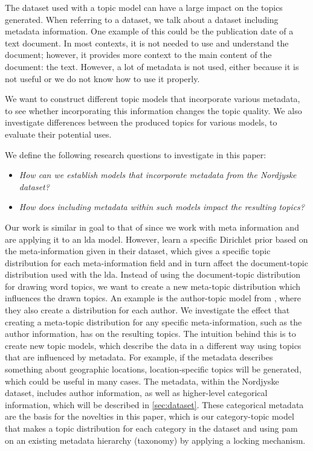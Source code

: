 The dataset used with a topic model can have a large impact on the topics generated.
When referring to a dataset, we talk about a dataset including metadata information.
One example of this could be the publication date of a text document. 
In most contexts, it is not needed to use and understand the document; however, it provides more context to the main content of the document: the text.
However, a lot of metadata is not used, either because it is not useful or we do not know how to use it properly. 

We want to construct different topic models that incorporate various metadata, to see whether incorporating this information changes the topic quality. 
We also investigate differences between the produced topics for various models, to evaluate their potential uses.

We define the following research questions to investigate in this paper:

\begin{itemize}
	\item \textit{How can we establish models that incorporate metadata from the Nordjyske dataset?}
	\item \textit{How does including metadata within such models impact the resulting topics?}
\end{itemize}

Our work is similar in goal to that of \citet{MetaLDA2017} since we work with meta information and are applying it to an \gls{lda} model.
However, \citet{MetaLDA2017} learn a specific Dirichlet prior based on the meta-information given in their dataset, which gives a specific topic distribution for each meta-information field and in turn affect the document-topic distribution used with the \gls{lda}.
Instead of using the document-topic distribution for drawing word topics, we want to create a new meta-topic distribution which influences the drawn topics.
An example is the author-topic model from \citet{author_topic_2012}, where they also create a distribution for each author.
We investigate the effect that creating a meta-topic distribution for any specific meta-information, such as the author information, has on the resulting topics.
The intuition behind this is to create new topic models, which describe the data in a different way using topics that are influenced by metadata.
For example, if the metadata describes something about geographic locations, location-specific topics will be generated, which could be useful in many cases.
The metadata, within the Nordjyske dataset, includes author information, as well as higher-level categorical information, which will be described in \autoref{sec:dataset}.
These categorical metadata are the basis for the novelties in this paper, which is our category-topic model that makes a topic distribution for each category in the dataset and using \gls{pam} on an existing metadata hierarchy (taxonomy) by applying a locking mechanism.

